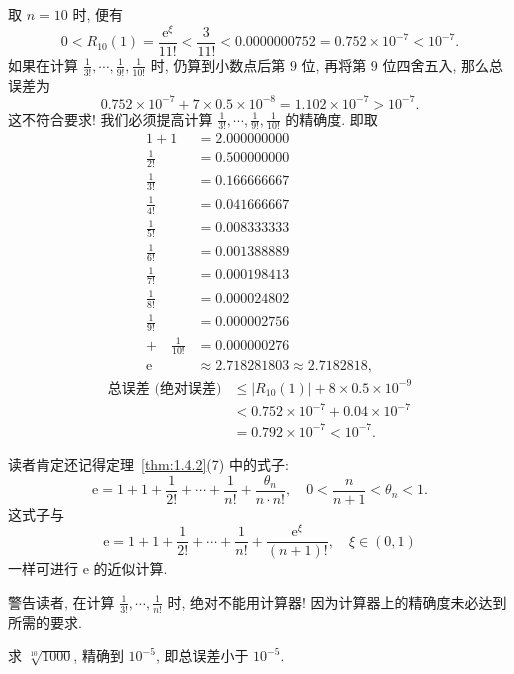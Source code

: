 \begin{solution}
取 $n=10$ 时, 便有
\[
0<R_{10}(1)=\frac{\mathrm{e}^{\xi}}{11!}<\frac{3}{11!}<0.0000000752=0.752\times 10^{-7}<10^{-7}.
\]
如果在计算 $\frac{1}{3!},\cdots,\frac{1}{9!},\frac{1}{10!}$ 时, 仍算到小数点后第 $9$ 位, 再将第 $9$ 位四舍五入, 那么总误差为
\[
0.752\times 10^{-7}+7\times 0.5\times 10^{-8}=1.102\times 10^{-7}>10^{-7}.
\]
这不符合要求! 我们必须提高计算 $\frac{1}{3!},\cdots,\frac{1}{9!},\frac{1}{10!}$ 的精确度. 即取
\begin{align*}
1+1 &= 2.000000000 \\
\frac{1}{2!} &= 0.500000000 \\
\frac{1}{3!} &= 0.166666667 \\
\frac{1}{4!} &= 0.041666667 \\
\frac{1}{5!} &= 0.008333333 \\
\frac{1}{6!} &= 0.001388889 \\
\frac{1}{7!} &= 0.000198413 \\
\frac{1}{8!} &= 0.000024802 \\
\frac{1}{9!} &= 0.000002756 \\
+\quad \frac{1}{10!} &= 0.000000276 \\
\hline
\mathrm{e} &\approx 2.718281803 \approx 2.7182818,
\end{align*}
\begin{align*}
\text{总误差 (绝对误差)}
&\leqslant |R_{10}(1)|+8\times 0.5\times 10^{-9} \\
&< 0.752\times 10^{-7}+0.04\times 10^{-7} \\
&= 0.792\times 10^{-7}<10^{-7}.
\end{align*}
\end{solution}

\begin{remark}\label{rem:4.2.1}
读者肯定还记得定理~\ref{thm:1.4.2}(7) 中的式子:
\[
\mathrm{e}=1+1+\frac{1}{2!}+\cdots+\frac{1}{n!}+\frac{\theta_{n}}{n\cdot n!},\quad 0<\frac{n}{n+1}<\theta_{n}<1.
\]
这式子与
\[
\mathrm{e}=1+1+\frac{1}{2!}+\cdots+\frac{1}{n!}+\frac{\mathrm{e}^{\xi}}{(n+1)!},\quad\xi\in(0,1)
\]
一样可进行 $\mathrm{e}$ 的近似计算.
\end{remark}

\begin{remark}\label{rem:4.2.2}
警告读者, 在计算 $\frac{1}{3!},\cdots,\frac{1}{n!}$ 时, 绝对不能用计算器! 因为计算器上的精确度未必达到所需的要求.
\end{remark}

\begin{example}\label{ex:4.2.14}
求 $\sqrt[10]{1000}$, 精确到 $10^{-5}$, 即总误差小于 $10^{-5}$.
\end{example}

